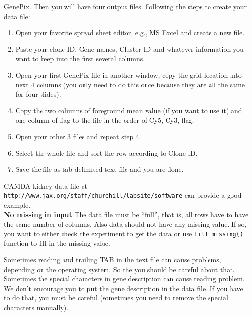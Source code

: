 GenePix. Then you will have four output files. Following the steps to create your data file:
\begin{enumerate}
\item Open your favorite spread sheet editor, e.g., MS Excel and 
create a new file.
\item Paste your clone ID, Gene names, Cluster ID and whatever
information you want to keep into the first several columns.
\item Open your first GenePix file in another window, 
copy the grid location into next 4 columns (you only need to do this once
because they are all the same for four slides).
\item Copy the two columns of foreground mean value (if you want to use it)
and one column of flag to the file in the order of Cy5, Cy3, flag.
\item Open your other 3 files and repeat step 4.
\item Select the whole file and sort the row according to Clone ID.
\item Save the file as tab delimited text file and you are done. 
\end{enumerate}
CAMDA kidney data file at {\tt
http://www.jax.org/staff/churchill/labsite/software} can provide a good example.\\
{\bf No missing in input} The data file must be ``full'', that is, all rows
have to have the same number of columns. Also data should not have any missing
value. If so, you want to either check the experiment to get the data or
use {\tt fill.missing()} function to fill in the missing value. 

Sometimes reading and trailing TAB in the text file can cause
problems, depending on the operating system. So the you should be careful
about that. Sometimes the special characters in gene description can
cause reading problem. We don't encourage you to put the gene description
in the data file. If you have to do that, you must be careful (sometimes
you need to remove the special characters manually).
